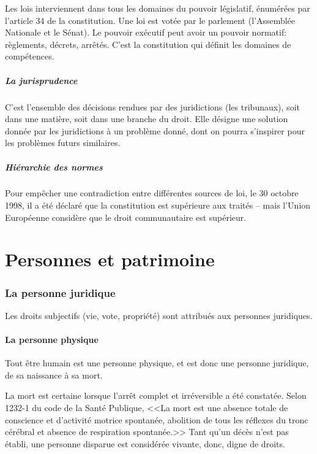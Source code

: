 \documentclass[10pt,a4paper,french]{article}
\begin{document}
Les lois interviennent dans tous les domaines du pouvoir législatif, énumérées par l'article 34 de la constitution. Une loi est votée par le parlement (l'Assemblée Nationale et le Sénat). Le pouvoir exécutif peut avoir un pouvoir normatif: règlements, décrets, arrêtés. C'est la constitution qui définit les domaines de compétences.

\subsubsection{La jurisprudence}

C'est l'ensemble des décisions rendues par des juridictions (les tribunaux), soit dans une matière, soit dans une branche du droit. Elle désigne une solution donnée par les juridictions à un problème donné, dont on pourra s'inspirer pour les problèmes futurs similaires.

\subsubsection{Hiérarchie des normes}

Pour empêcher une contradiction entre différentes sources de loi, le 30 octobre 1998, il a été déclaré que la constitution est supérieure aux traités -- mais l'Union Européenne considère que le droit communautaire est supérieur.

\part{Personnes et patrimoine}

\section{La personne juridique}

Les droits subjectifs (vie, vote, propriété) sont attribués aux personnes juridiques.

\subsection{La personne physique}

Tout être humain est une personne physique, et est donc une personne juridique, de sa naissance à sa mort.

La mort est certaine lorsque l'arrêt complet et irréversible a été constatée. Selon 1232-1 du code de la Santé Publique, <<La mort est une absence totale de conscience et d'activité motrice spontanée, abolition de tous les réflexes du tronc cérébral et absence de respiration spontanée.>> Tant qu'un décès n'est pas établi, une personne disparue est considérée vivante, donc, digne de droits.
\end{document}

